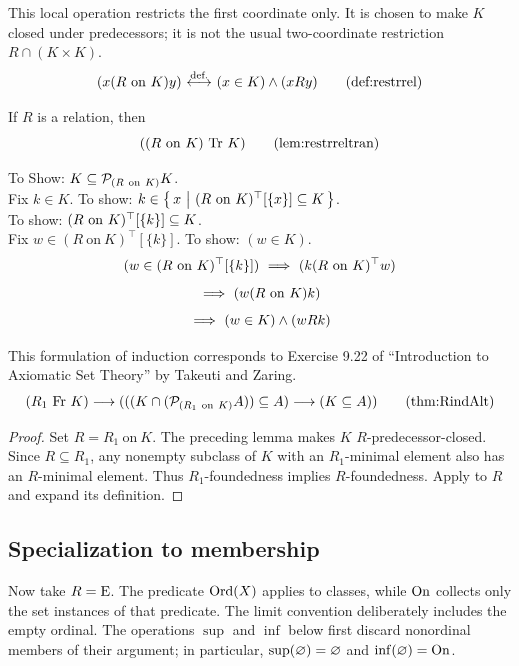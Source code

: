\begin{definition}
This local operation restricts the first coordinate only. It is chosen to
make $K$ closed under predecessors; it is not the usual two-coordinate
restriction $R\cap(K\times K)$.
\[
(x(R\mathrm{\ on\ }K)y)
\iffdef
(x\in K)\land(xRy)
\labeltagd{def}{restrrel}
\]
\end{definition}
\begin{lemma}
If $R$ is a relation, then
\[
((R\mathrm{\ on\ }K)\mathrm{\ Tr\ }K)
\labeltagd{lem}{restrreltran}
\]
\end{lemma}
\Proof
To Show: $K\subclass \power_{(R\mathrm{\ on\ }K)}K$.\\
Fix $k\in K$. To show: $k\in\cc{x}{(R\mathrm{\ on\ }K)^\top[\{x\}]\subclass K}$.\\
To show: $(R\mathrm{\ on\ }K)^\top[\{k\}]\subclass K$.\\
Fix $w\in (R\mathrm{\ on\ }K)^\top[\{k\}]$. To show: $(w\in K)$.
\[
(w\in (R\mathrm{\ on\ }K)^\top[\{k\}])
\ \Longrightarrow\ 
(k(R\mathrm{\ on\ }K)^\top w)
\]
\[
\ \Longrightarrow\ 
(w(R\mathrm{\ on\ }K) k)
\]
\[
\ \Longrightarrow\ 
(w\in K)\land (wRk)
\]
\Done


\begin{corollary}
This formulation of induction corresponds to Exercise 9.22 of ``Introduction to Axiomatic Set Theory'' by Takeuti and Zaring.
\[
(R_1\mathrm{\ Fr\ } K)
\implies
(
((K\cap(\power_{(R_1\mathrm{\ on\ }K)} A))\subclass A)
\implies
(K\subclass A)
)
\labeltagd{thm}{RindAlt}
\]
\begin{proof}
Set $R=R_1\mathrm{\ on\ }K$. The preceding lemma makes $K$
$R$-predecessor-closed. Since $R\subseteq R_1$, any nonempty subclass of
$K$ with an $R_1$-minimal element also has an $R$-minimal element. Thus
$R_1$-foundedness implies $R$-foundedness. Apply
 to $R$ and expand its definition.
\end{proof}
\end{corollary}

\subsection{Specialization to membership}
Now take $R=\mathrm{E}$. The predicate $\mathrm{Ord}(X)$ applies to classes, while
$\mathrm{On}$ collects only the set instances of that predicate. The limit
convention deliberately includes the empty ordinal. The operations
$\sup$ and $\inf$ below first discard nonordinal members of their argument;
in particular, $\sup(\varnothing)=\varnothing$ and
$\inf(\varnothing)=\mathrm{On}$.

